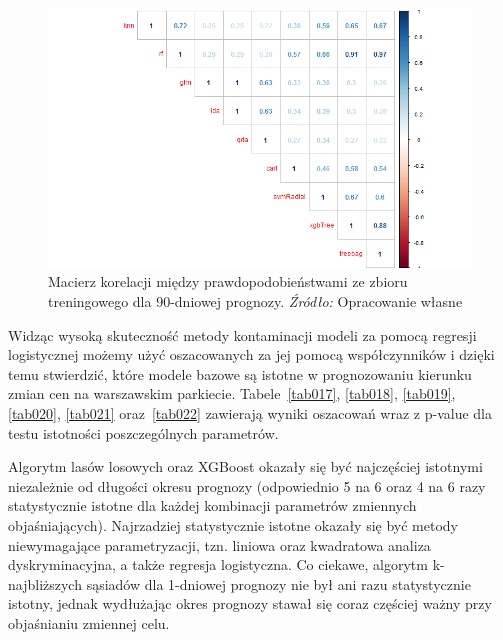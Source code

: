 \documentclass[12pt,a4paper,twoside,openany]{book}
\begin{document}
\begin{figure}
\centering
\includegraphics[scale=0.5]{./rys012}
\caption{Macierz korelacji między prawdopodobieństwami ze zbioru treningowego dla 90-dniowej prognozy. \textit{Źródło:} Opracowanie własne}\label{rys012}
\end{figure}


Widząc wysoką skuteczność metody kontaminacji modeli za pomocą regresji logistycznej możemy użyć oszacowanych za jej pomocą współczynników i dzięki temu stwierdzić, które modele bazowe są istotne w prognozowaniu kierunku zmian cen na warszawskim parkiecie. Tabele~\ref{tab017}, \ref{tab018}, \ref{tab019}, \ref{tab020}, \ref{tab021} oraz~\ref{tab022} zawierają wyniki oszacowań wraz z p-value dla testu istotności poszczególnych parametrów.

Algorytm lasów losowych oraz XGBoost okazały się być najczęściej istotnymi niezależnie od długości okresu prognozy (odpowiednio 5 na 6 oraz 4 na 6 razy statystycznie istotne dla każdej kombinacji parametrów zmiennych objaśniających). Najrzadziej statystycznie istotne okazały się być metody niewymagające parametryzacji, tzn. liniowa oraz kwadratowa analiza dyskryminacyjna, a także regresja logistyczna. Co ciekawe, algorytm k-najbliższych sąsiadów dla 1-dniowej prognozy nie był ani razu statystycznie istotny, jednak wydłużając okres prognozy stawał się coraz częściej ważny przy objaśnianiu zmiennej celu.
\end{document}
